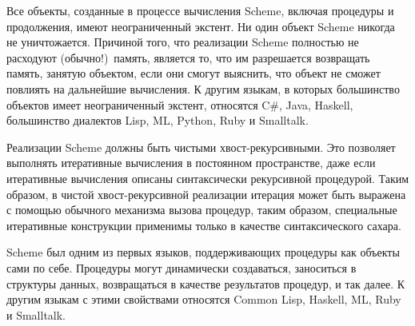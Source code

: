 \vest Все объекты, созданные в процессе вычисления Scheme, включая процедуры и продолжения,
имеют неограниченный экстент. Ни один объект Scheme никогда не уничтожается. Причиной того, что
реализации Scheme полностью не расходуют (обычно!)\ память, является то, что им разрешается
возвращать память, занятую объектом, если они смогут выяснить, что объект не сможет
повлиять на дальнейшие вычисления. К другим языкам, в которых большинство объектов имеет
неограниченный экстент, относятся C\#, Java, Haskell, большинство диалектов Lisp, ML, Python,
Ruby и Smalltalk.

Реализации Scheme должны быть чистыми хвост-рекурсивными. Это позволяет выполнять итеративные
вычисления в постоянном пространстве, даже если итеративные вычисления описаны синтаксически
рекурсивной процедурой. Таким образом, в чистой хвост-рекурсивной реализации итерация может быть
выражена с помощью обычного механизма вызова процедур, таким образом, специальные итеративные
конструкции применимы только в качестве синтаксического сахара.

\vest Scheme был одним из первых языков, поддерживающих процедуры как объекты сами по себе.
Процедуры могут динамически создаваться, заноситься в структуры данных, возвращаться в качестве
результатов процедур, и так далее. К другим языкам с этими свойствами относятся Common Lisp,
Haskell, ML, Ruby и Smalltalk.

